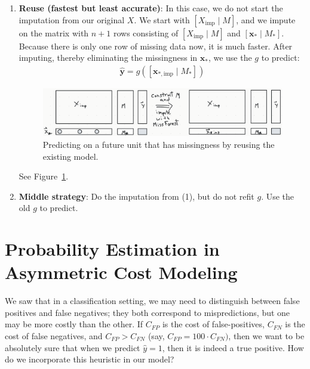\documentclass[12pt, a4paper]{article}
\theoremstyle{definition}
\begin{document}
\begin{enumerate}[label=(\textbf{\arabic*})]
		\item \textbf{Reuse (fastest but least accurate)}: In this case, we
		do not start the imputation from our original $X$. We start with
		$[X_{\text{imp}} \mid M]$, and we impute on the matrix with $n+1$ rows
		consisting of $[X_{\text{imp}} \mid M]$ and $[\bm{x}_* \mid M_*]$.
		Because there is only one row of missing data now, it is much faster.
		After imputing, thereby eliminating the missingness in $\bm{x}_*$,
		we use the  $g$ to predict:
		\begin{align*}
			\hat{\bm{y}} = g([\bm{x}_{*, \text{imp}} \mid M_*])
		\end{align*}
		\begin{figure}
			\centering
			\includegraphics[width=1.0\textwidth]{predicting-future-unit-with-missingness-reuse}
			\caption{Predicting on a future unit that has missingness by reusing the existing model.}
			\label{fig:predicting-future-by-reuse}
		\end{figure}
		See Figure~\ref{fig:predicting-future-by-reuse}.
		
		\item \textbf{Middle strategy}: Do the imputation from (1), but do not
		refit $g$. Use the old $g$ to predict.
	\end{enumerate}
	\section{Probability Estimation in Asymmetric Cost Modeling}
	We saw that in a classification setting, we may need to distinguish between
	false positives and false negatives; they both correspond to mispredictions,
	but one may be more costly than the other. If $C_{FP}$ is the cost of
	false-positives, $C_{FN}$ is the cost of false negatives, and
	$C_{FP} > C_{FN}$ (say, $C_{FP}= 100 \cdot C_{FN})$, then we want to be
	absolutely sure that when we predict $\hat{y} = 1$, then it is indeed
	a true positive. How do we incorporate this heuristic in our model?
	
\end{document}

